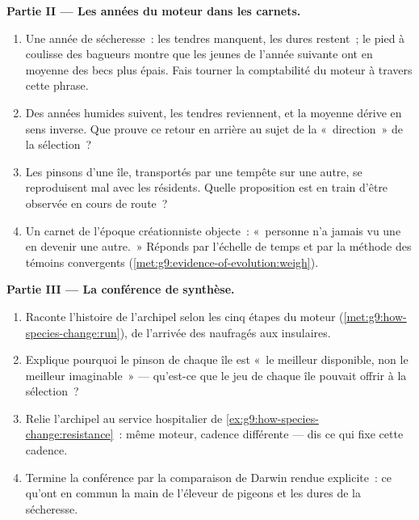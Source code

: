 \begin{problem}
\medskip\noindent\textbf{Partie II --- Les années du
moteur dans les carnets.}
\begin{enumerate}[resume]
  \item Une année de sécheresse~: les  tendres
        manquent, les  dures restent~; le pied à
        coulisse des bagueurs montre que les jeunes de
        l'année suivante ont en moyenne des becs plus
        épais. Fais tourner la comptabilité du moteur à
        travers cette phrase.
  \item Des années humides suivent, les  tendres
        reviennent, et la moyenne dérive en sens inverse.
        Que prouve ce retour en arrière au sujet de la
        «~direction~» de la sélection~?
  \item Les pinsons d'une île, transportés par une tempête
        sur une autre, se reproduisent mal avec les
        résidents. Quelle proposition est en train d'être
        observée en cours de route~?
  \item Un carnet de l'époque créationniste objecte~:
        «~personne n'a jamais vu une  en devenir une
        autre.~» Réponds par l'échelle de temps et par la
        méthode des témoins convergents
        (\cref{met:g9:evidence-of-evolution:weigh}).
\end{enumerate}

\medskip\noindent\textbf{Partie III --- La conférence de
synthèse.}
\begin{enumerate}[resume]
  \item Raconte l'histoire de l'archipel selon les cinq
        étapes du moteur
        (\cref{met:g9:how-species-change:run}), de
        l'arrivée des naufragés aux  insulaires.
  \item Explique pourquoi le pinson de chaque île est
        «~le meilleur disponible, non le meilleur
        imaginable~» --- qu'est-ce que le jeu de chaque île
        pouvait offrir à la sélection~?
  \item Relie l'archipel au service hospitalier de
        \cref{ex:g9:how-species-change:resistance}~: même
        moteur, cadence différente --- dis ce qui fixe
        cette cadence.
  \item Termine la conférence par la comparaison de Darwin
        rendue explicite~: ce qu'ont en commun la main de
        l'éleveur de pigeons et les  dures de la
        sécheresse.
\end{enumerate}
\end{problem}
